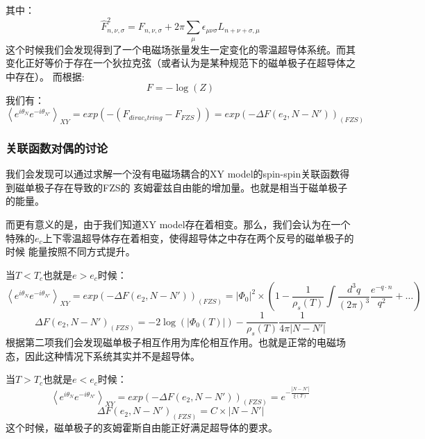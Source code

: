 \documentclass{article}
\begin{document}
其中：
\begin{equation}
    \hat F_{n,\nu,\sigma}^2 = F_{n,\nu,\sigma}+ 2 \pi \sum_{\mu} \epsilon_{\mu\nu\sigma}L_{n+\nu+\sigma,\mu}
\end{equation}
这个时候我们会发现得到了一个电磁场张量发生一定变化的零温超导体系统。而其变化正好等价于存在一个狄拉克弦（或者认为是某种规范下的磁单极子在超导体之中存在）。
而根据:
\begin{equation}
    F = -\log(Z)
\end{equation}
我们有：
\begin{equation}
    \left\langle e^{i \theta_N}e^{- i \theta_{N'}} \right\rangle _{XY} = exp\left(-\left(F_{dirac_string} - F_{FZS}\right) \right) = exp\left(- \Delta F(e_2, N-N')\right)_{(FZS)} 
\end{equation}

\subsubsection{关联函数对偶的讨论}
我们会发现可以通过求解一个没有电磁场耦合的XY model的spin-spin关联函数得到磁单极子存在导致的FZS的
亥姆霍兹自由能的增加量。也就是相当于磁单极子的能量。

而更有意义的是，由于我们知道XY model存在着相变。那么，我们会认为在一个特殊的$e_c$上下零温超导体存在着相变，使得超导体之中存在两个反号的磁单极子的时候
能量按照不同方式提升。

当$T < T_c$也就是$e>e_c$时候：
\begin{equation}
    \left\langle e^{i \theta_N}e^{- i \theta_{N'}} \right\rangle _{XY} = exp\left(- \Delta F(e_2, N-N')\right)_{(FZS)}  = |\Phi_0|^2 \times \left(1-\frac{1}{\rho_s(T)}\int \frac{d^3 q}{(2\pi)^3}\frac{e^{-q \cdot n}}{q^2} +\dots \right) 
\end{equation}
\begin{equation}
    \Delta F(e_2, N-N')_{(FZS)}= -2 \log(|\Phi_0(T)|) - \frac{1}{\rho_s(T)}\frac{1}{4 \pi |N-N'|}
\end{equation}
根据第二项我们会发现磁单极子相互作用为库伦相互作用。也就是正常的电磁场态，因此这种情况下系统其实并不是超导体。


当$T > T_c$也就是$e<e_c$时候：
\begin{equation}
    \left\langle e^{i \theta_N}e^{- i \theta_{N'}} \right\rangle _{XY} = exp\left(- \Delta F(e_2, N-N')\right)_{(FZS)}  = e^{- \frac{|N-N'|}{\xi(T)}}
\end{equation}
\begin{equation}
    \Delta F(e_2, N-N')_{(FZS)}= C \times |N-N'|
\end{equation}
这个时候，磁单极子的亥姆霍斯自由能正好满足超导体的要求。
\end{document}
